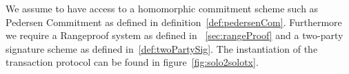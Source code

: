 We assume to have access to a homomorphic commitment scheme such as Pedersen Commitment as defined in definition~\ref{def:pedersenCom}. Furthermore we require a Rangeproof system as defined in
~\ref{sec:rangeProof} and a two-party signature scheme as defined in~\ref{def:twoPartySig}. The instantiation of the transaction protocol can be found in figure~\ref{fig:solo2solotx}.
\begin{figure}
    \begin{center}
\end{center}
\end{figure}
